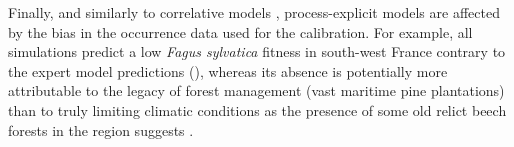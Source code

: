 \documentclass[letterpaper,8pt]{extarticle}  %
\begin{document}
\begin{doublespacing}
\begin{linenumbers}

Finally, and similarly to correlative models \citep{BarbetMassin2010, Duputie2014},  process-explicit models are affected by the bias in the occurrence data used for the calibration. For example, all simulations predict a low \emph{Fagus sylvatica} fitness in south-west France contrary to the expert model predictions (), whereas its absence is potentially more attributable to the legacy of forest management (vast maritime pine plantations) than to truly limiting climatic conditions as the presence of some old relict beech forests in the region suggests \citep{Lafontaine2014}.


\end{linenumbers}
\end{doublespacing}
\end{document}
